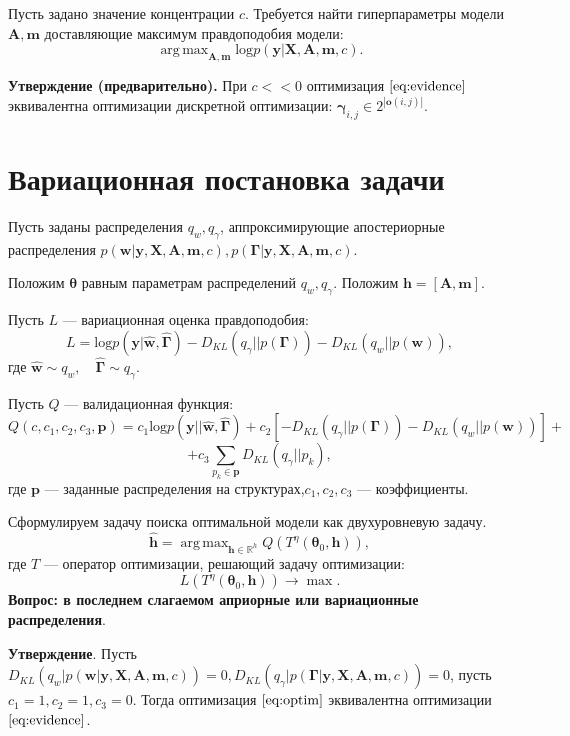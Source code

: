 \documentclass[12pt]{article}
\DeclareMathOperator*{\argmax}{arg\,max}
\begin{document}
Пусть задано значение концентрации $c$. 
Требуется найти гиперпараметры модели $\mathbf{A}, \mathbf{m}$ доставляющие максимум правдоподобия модели:
\[
    \argmax_{\mathbf{A}, \mathbf{m}}  \text{log}p(\mathbf{y}|\mathbf{X},\mathbf{A},\mathbf{m}, c).
\]

\textbf{Утверждение (предварительно).} При $c << 0$ оптимизация  $\eqref{eq:evidence}$ эквивалентна оптимизации дискретной оптимизации: $\boldsymbol{\gamma}_{i,j} \in 2^{|\mathbf{o}(i,j)|}$.


\section{Вариационная постановка задачи}
Пусть заданы распределения $q_w, q_\gamma$, аппроксимирующие апостериорные распределения $p(\mathbf{w}|\mathbf{y}, \mathbf{X}, \mathbf{A},\mathbf{m}, c), p(\boldsymbol{\Gamma}|\mathbf{y}, \mathbf{X}, \mathbf{A},\mathbf{m}, c).$

Положим $\boldsymbol{\theta}$ равным параметрам распределений $q_w, q_\gamma$. 
Положим $\mathbf{h} = [\mathbf{A}, \mathbf{m}].$

Пусть $L$ --- вариационная оценка правдоподобия:
\[
    L = \text{log} p(\mathbf{y}|\hat{\mathbf{w}}, \hat{\boldsymbol{\Gamma}}) - {D_{KL}}(q_\gamma||p(\boldsymbol{\Gamma})) - {D_{KL}}(q_{w}||p(\mathbf{w})),
\]
где $\hat{\mathbf{w}} \sim q_w, \quad \hat{\boldsymbol{\Gamma}} \sim q_\gamma$.

Пусть $Q$ --- валидационная функция:
\[
    Q(c, c_1, c_2, c_3, \mathbf{p}) = c_1\text{log} p(\mathbf{y}||\hat{\mathbf{w}}, \hat{\boldsymbol{\Gamma}}) + c_2[-{D_{KL}}(q_\gamma||p(\boldsymbol{\Gamma})) - {D_{KL}}(q_{w}||p(\mathbf{w}))] + 
\]
\[
    + c_3\sum_{p_k \in \mathbf{p}}{D_{KL}}(q_\gamma||p_k),
\]
где $\mathbf{p}$ --- заданные распределения на структурах,$c_1,c_2,c_3$ --- коэффициенты.

Сформулируем задачу поиска оптимальной модели как двухуровневую задачу.
\begin{equation}
\label{eq:optim}
	\hat{\mathbf{h}} = \argmax_{\mathbf{h} \in \mathbb{R}^h} Q( T^\eta(\boldsymbol{\theta}_0, \mathbf{h})),
\end{equation}
где $T$ --- оператор оптимизации, решающий задачу оптимизации:
\[
    L(T^\eta(\boldsymbol{\theta}_0, \mathbf{h})) \to \max.
\]
\textbf{Вопрос: в последнем слагаемом априорные или вариационные распределения}.


\textbf{Утверждение}. Пусть $D_{KL}(q_w|p(\mathbf{w}|\mathbf{y}, \mathbf{X}, \mathbf{A},\mathbf{m}, c)) = 0, D_{KL}(q_\gamma|p(\boldsymbol{\Gamma}|\mathbf{y}, \mathbf{X}, \mathbf{A},\mathbf{m}, c)) = 0$, пусть $c_1 = 1, c_2 = 1, c_3 = 0$. Тогда оптимизация $\eqref{eq:optim}$ эквивалентна оптимизации $\eqref{eq:evidence}$.
\end{document}
